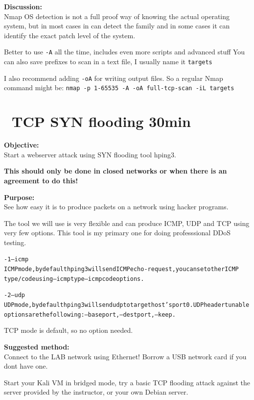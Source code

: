 \documentclass[a4paper,11pt,notitlepage]{report}
\begin{document}
{\bf Discussion:}\\
Nmap OS detection is not a full proof way of knowing the actual operating system, but in most cases in can detect the family and in some cases it can identify the exact patch level of the system.

Better to use \verb+-A+ all the time, includes even more scripts and advanced stuff
You can also save prefixes to scan in a text file, I usually name it \verb+targets+

I also recommend adding \verb+-oA+ for writing output files. So a regular Nmap command might be:
\verb+nmap -p 1-65535 -A -oA full-tcp-scan -iL targets+



\chapter{\faInfoCircle\ TCP SYN flooding 30min}
\label{ex:syn-flood}

{\bf Objective:}\\
Start a webserver attack using SYN flooding tool hping3.

{\color{red} \bf This should only be done in closed networks or when there is an agreement to do this!}

{\bf Purpose:}\\
See how easy it is to produce packets on a network using hacker programs.

The tool we will use is very flexible and can produce ICMP, UDP and TCP using very few options. This tool is my primary one for doing professsional DDoS testing.

\begin{alltt}\footnotesize
-1 --icmp
       ICMP  mode,  by  default  hping3  will  send  ICMP echo-request, you can set other ICMP
       type/code using --icmptype --icmpcode options.

-2 --udp
       UDP mode, by default hping3 will send udp to target host's port 0.  UDP header  tunable
       options are the following: --baseport, --destport, --keep.
\end{alltt}

TCP mode is default, so no option needed.


{\bf Suggested method:}\\
Connect to the LAB network using Ethernet! Borrow a USB network card if you dont have one.

Start your Kali VM in bridged mode, try a basic TCP flooding attack against the server provided by the instructor, or your own Debian server.
\end{document}
